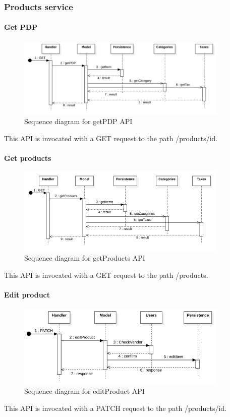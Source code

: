\subsubsection{Products service}
\paragraph*{Get PDP}
\begin{figure}[H]
    \includegraphics[width=0.9\textwidth]{res/images/sequence-diagrams/products/getPDP.png}
    \caption{Sequence diagram for getPDP API}
\end{figure}
This API is invocated with a GET request to the path /products/{id}.

\paragraph*{Get products}
\begin{figure}[H]
    \includegraphics[width=0.9\textwidth]{res/images/sequence-diagrams/products/getProducts.png}
    \caption{Sequence diagram for getProducts API}
\end{figure}
This API is invocated with a GET request to the path /products.

\paragraph*{Edit product}
\begin{figure}[H]
    \includegraphics[width=0.9\textwidth]{res/images/sequence-diagrams/products/editProduct.png}
    \caption{Sequence diagram for editProduct API}
\end{figure}
This API is invocated with a PATCH request to the path /products/{id}.

